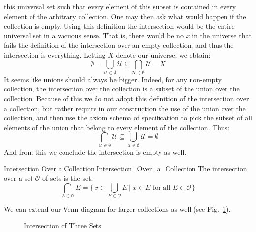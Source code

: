         this universal set such that every element of this subset is
        contained in every element of the arbitrary collection. One may then
        ask what would happen if the collection is empty. Using this
        definition the intersection would be the entire universal set
        in a vacuous sense. That is, there would be no $x$ in the universe
        that fails the definition of the intersection over an empty
        collection, and thus the intersection is everything. Letting $X$
        denote our universe, we obtain:
        \begin{equation}
            \emptyset
            =\bigcup_{\mathcal{U}\in\emptyset}\mathcal{U}
            \subseteq\bigcap_{\mathcal{U}\in\emptyset}\mathcal{U}
            =X
        \end{equation}
        It seems like unions should always be bigger. Indeed, for any
        non-empty collection, the intersection over the collection is a
        subset of the union over the collection. Because of this we do
        not adopt this definition of the intersection over a collection,
        but rather require in our construction the use of the union over
        the collection, and then use the axiom schema of specification to
        pick the subset of all elements of the union that belong to every
        element of the collection. Thus:
        \begin{equation}
            \bigcap_{\mathcal{U}\in\emptyset}\mathcal{U}
            \subseteq\bigcup_{\mathcal{U}\in\emptyset}\mathcal{U}
            =\emptyset
        \end{equation}
        And from this we conclude the intersection is empty as well.
        \begin{fdefinition}{Intersection Over a Collection}
                           {Intersection_Over_a_Collection}
            The \gls{intersection over a set} $\mathcal{O}$
            of sets is the set:
            \begin{equation*}
                \bigcap_{E\in\mathcal{O}}E
                =\Big\{\,x\in\bigcup_{E\in\mathcal{O}}E\;\Big|\;x\in{E}
                    \textrm{ for all }E\in\mathcal{O}\,\Big\}
            \end{equation*}
        \end{fdefinition}
        We can extend our Venn diagram for larger collections as well
        (see Fig.~\ref{fig:Intersection_of_Three_Sets}).
        \begin{figure}[H]
            \centering
            
            \caption{Intersection of Three Sets}
            \label{fig:Intersection_of_Three_Sets}
        \end{figure}
